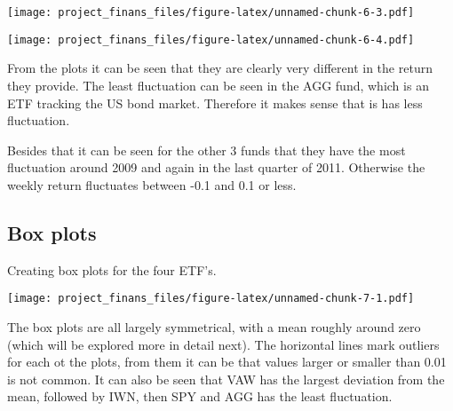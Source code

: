 \documentclass[
]{article}
\newenvironment{Shaded}{\begin{snugshade}}{\end{snugshade}}
\newcommand{\AttributeTok}[1]{\textcolor[rgb]{0.77,0.63,0.00}{#1}}
\newcommand{\FunctionTok}[1]{\textcolor[rgb]{0.00,0.00,0.00}{#1}}
\newcommand{\NormalTok}[1]{#1}
\newcommand{\SpecialCharTok}[1]{\textcolor[rgb]{0.00,0.00,0.00}{#1}}
\newcommand{\StringTok}[1]{\textcolor[rgb]{0.31,0.60,0.02}{#1}}
\begin{document}
\texttt{[image: project\_finans\_files/figure-latex/unnamed-chunk-6-3.pdf]}

\begin{Shaded}
\end{Shaded}

\texttt{[image: project\_finans\_files/figure-latex/unnamed-chunk-6-4.pdf]}

From the plots it can be seen that they are clearly very different in
the return they provide. The least fluctuation can be seen in the AGG
fund, which is an ETF tracking the US bond market. Therefore it makes
sense that is has less fluctuation.

Besides that it can be seen for the other 3 funds that they have the
most fluctuation around 2009 and again in the last quarter of 2011.
Otherwise the weekly return fluctuates between -0.1 and 0.1 or less.

\subsection{Box plots}

Creating box plots for the four ETF's.

\begin{Shaded}
\end{Shaded}

\texttt{[image: project\_finans\_files/figure-latex/unnamed-chunk-7-1.pdf]}

The box plots are all largely symmetrical, with a mean roughly around
zero (which will be explored more in detail next). The horizontal lines
mark outliers for each ot the plots, from them it can be that values
larger or smaller than 0.01 is not common. It can also be seen that VAW
has the largest deviation from the mean, followed by IWN, then SPY and
AGG has the least fluctuation.
\end{document}
